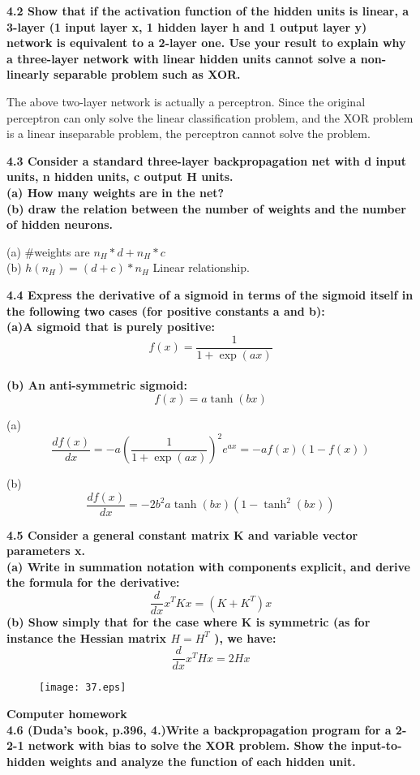\noindent\textbf{4.2 Show that if the activation function of the hidden units is linear, a 3-layer (1 input layer x, 1
hidden layer h and 1 output layer y) network is equivalent to a 2-layer one. Use your result to
explain why a three-layer network with linear hidden units cannot solve a non-linearly separable
problem such as XOR.}

The above two-layer network is actually a perceptron. Since the original perceptron can only solve the linear classification problem, and the XOR problem is a linear inseparable problem, the perceptron cannot solve the problem.

\noindent\textbf{4.3 Consider a standard three-layer backpropagation net with d input units, n hidden units, c output
H units. \\\noindent (a) How many weights are in the net? \\\noindent(b) draw the relation between the number of weights and the number of hidden neurons.}

(a) \#weights are $n_H*d+n_H*c$\\
\indent (b) $h(n_H) = (d+c)*n_H$  Linear relationship.


\noindent\textbf{4.4 Express the derivative of a sigmoid in terms of the sigmoid itself in the following two cases (for positive constants a and b): \\
(a)A sigmoid that is purely positive:$$f(x)=\frac{1}{1+\exp(ax)}$$\\
(b) An anti-symmetric sigmoid: $$f(x)=a\tanh(bx)$$}

(a)$$\frac{df(x)}{dx} = -a(\frac{1}{1+\exp(ax)})^2e^{ax}=-af(x)(1-f(x))$$

(b)$$\frac{df(x)}{dx} = -2b^2a\tanh(bx)(1-\tanh^2(bx))$$



\newpage
\noindent \textbf{4.5 Consider a general constant matrix K and variable vector parameters x.\\
(a) Write in summation notation with components explicit, and derive the formula
for the derivative:$$\frac{d}{dx}x^TKx = (K+K^T)x$$
(b) Show simply that for the case where K is symmetric (as for instance the Hessian
matrix $H = H^T$ ), we have:$$\frac{d}{dx}x^THx = 2Hx$$}
\begin{figure}[!h]
  \texttt{[image: 37.eps]}
\end{figure}

\newpage
\noindent \textbf{Computer homework}\\
\noindent \textbf{4.6 (Duda’s book, p.396, 4.)Write a backpropagation program for a 2-2-1 network with bias to solve the
XOR problem. Show the input-to-hidden weights and analyze the function of each hidden unit.}

